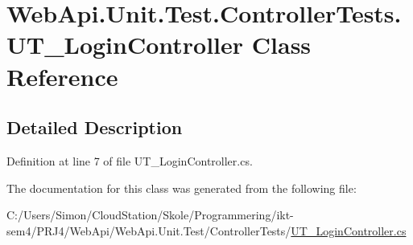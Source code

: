 \hypertarget{class_web_api_1_1_unit_1_1_test_1_1_controller_tests_1_1_u_t___login_controller}{}\section{Web\+Api.\+Unit.\+Test.\+Controller\+Tests.\+U\+T\+\_\+\+Login\+Controller Class Reference}
\label{class_web_api_1_1_unit_1_1_test_1_1_controller_tests_1_1_u_t___login_controller}


\subsection{Detailed Description}


Definition at line 7 of file U\+T\+\_\+\+Login\+Controller.\+cs.



The documentation for this class was generated from the following file\+:\begin{DoxyCompactItemize}
\item 
C\+:/\+Users/\+Simon/\+Cloud\+Station/\+Skole/\+Programmering/ikt-\/sem4/\+P\+R\+J4/\+Web\+Api/\+Web\+Api.\+Unit.\+Test/\+Controller\+Tests/\mbox{\hyperlink{_u_t___login_controller_8cs}{U\+T\+\_\+\+Login\+Controller.\+cs}}\end{DoxyCompactItemize}
